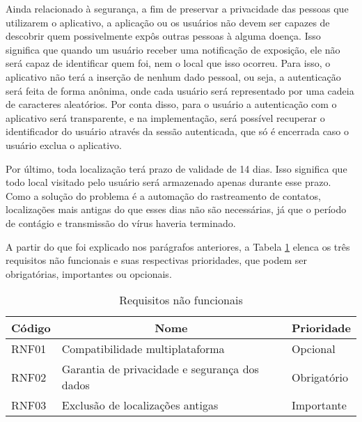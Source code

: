Ainda relacionado à segurança, a fim de preservar a privacidade das pessoas que utilizarem o aplicativo, a aplicação ou os usuários não devem ser capazes de descobrir quem possivelmente expôs outras pessoas à alguma doença. Isso significa que quando um usuário receber uma notificação de exposição, ele não será capaz de identificar quem foi, nem o local que isso ocorreu. Para isso, o aplicativo não terá a inserção de nenhum dado pessoal, ou seja, a autenticação será feita de forma anônima, onde cada usuário será representado por uma cadeia de caracteres aleatórios. Por conta disso, para o usuário a autenticação com o aplicativo será transparente, e na implementação, será possível recuperar o identificador do usuário através da sessão autenticada, que só é encerrada caso o usuário exclua o aplicativo.

Por último, toda localização terá prazo de validade de 14 dias. Isso significa que todo local visitado pelo usuário será armazenado apenas durante esse prazo. Como a solução do problema é a automação do rastreamento de contatos, localizações mais antigas do que esses dias não são necessárias, já que o período de contágio e transmissão do vírus haveria terminado.

A partir do que foi explicado nos parágrafos anteriores, a Tabela \ref{tab:tabelanf} elenca os três requisitos não funcionais e suas respectivas prioridades, que podem ser obrigatórias, importantes ou opcionais.

\begin{table}[!htb]
\caption[Tabela de requisitos não funcionais]{Requisitos não funcionais}
\label{tab:tabelanf}
\begin{center}
\begin{tabular}{|l|l|l|}
\hline
\multicolumn{1}{|c|}{\textbf{Código}} & \multicolumn{1}{c|}{\textbf{Nome}}            & \multicolumn{1}{c|}{\textbf{Prioridade}} \\ \hline
RNF01                                 & Compatibilidade multiplataforma               & Opcional                                 \\ \hline
RNF02                                 & Garantia de privacidade e segurança dos dados & Obrigatório                              \\ \hline
RNF03                                 & Exclusão de localizações antigas              & Importante                               \\ \hline
\end{tabular}
\end{center}
\end{table}

